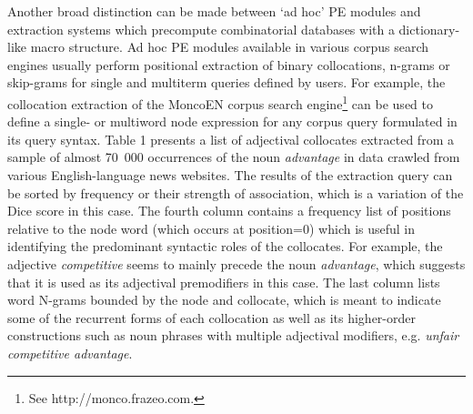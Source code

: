 \documentclass[12pt]{article}
\newenvironment{styleStandard}{\setlength\leftskip{0cm}\setlength\rightskip{0cm plus 1fil}\setlength\parindent{0cm}\setlength\parfillskip{0pt plus 1fil}\setlength\parskip{0in plus 1pt}\writerlistparindent\writerlistleftskip\leavevmode\normalfont\normalsize\writerlistlabel\ignorespaces}{\unskip\vspace{0.111in plus 0.0111in}\par}
\newcommand\writerlistleftskip{}
\newcommand\writerlistparindent{}
\newcommand\writerlistlabel{}
\begin{document}
\begin{styleStandard}
Another broad distinction can be made between ‘ad hoc’ PE modules and extraction systems which precompute combinatorial databases with a dictionary-like macro structure. Ad hoc PE modules available in various corpus search engines usually perform positional extraction of binary collocations, n-grams or skip-grams for single and multiterm queries defined by users. For example, the collocation extraction of the MoncoEN corpus search engine\footnote{ See http://\textrm{monco.frazeo.com.}} can be used to define a single- or multiword node expression for any corpus query formulated in its query syntax. Table 1 presents a list of adjectival collocates extracted from a sample of almost 70~000 occurrences of the noun \textit{advantage} in data crawled from various English-language news websites. The results of the extraction query can be sorted by frequency or their strength of association, which is a variation of the Dice score in this case. The fourth column contains a frequency list of positions relative to the node word (which occurs at position=0) which is useful in identifying the predominant syntactic roles of the collocates. For example, the adjective \textit{competitive} seems to mainly precede the noun \textit{advantage}, which suggests that it is used as its adjectival premodifiers in this case. The last column lists word N-grams bounded by the node and collocate, which is meant to indicate some of the recurrent forms of each collocation as well as its higher-order constructions such as noun phrases with multiple adjectival modifiers, e.g. \textit{unfair competitive advantage}.
\end{styleStandard}
\end{document}
